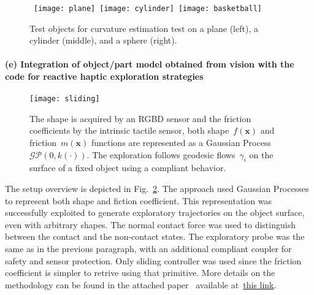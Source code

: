 \begin{figure}[!h]
    \centering
    \label{fig:curvature}
    \mbox{
    \texttt{[image: plane]}
    \texttt{[image: cylinder]}
    \texttt{[image: basketball]}
    }
    \caption{Test objects for curvature estimation test on a plane (left), a cylinder (middle), and a sphere (right).}
    \vspace{9pt}
\end{figure}



\paragraph{(e) Integration of object/part model obtained from vision with the code for reactive haptic exploration strategies}

\begin{figure}[!b]
  \begin{center}
    \texttt{[image: sliding]}
  \end{center}
  \caption{The shape is acquired by an RGBD sensor and the friction coefficients by the intrinsic tactile sensor, both shape~$f(\mathbf{x})$ and friction~$m(\mathbf{x})$ functions are represented as a Gaussian Process $\mathcal{GP}(0,k(\cdot))$. The exploration follows geodesic flows~$\gamma_i$ on the surface of a fixed object using a compliant behavior.}
  \label{fig:schema}
\end{figure}

The setup overview is depicted in Fig.~\ref{fig:schema}. The approach used Gaussian Processes to represent both shape and fiction coefficient. This representation was successfully exploited to generate exploratory trajectories on the object surface, even with arbitrary shapes. The normal contact force was used to distinguish between the contact and the non-contact states. The exploratory probe was the same as in the previous paragraph, with an additional compliant coupler for safety and sensor protection. Only sliding controller was used since the friction coefficient is simpler to retrive using that primitive. More details on the methodology can be found in the attached paper~\cite{Active2014Rosales} available at~\href{./attachedPapers/ActiveGatheringOfFrictionalPropertiesFromObjects.pdf}{this link}.


